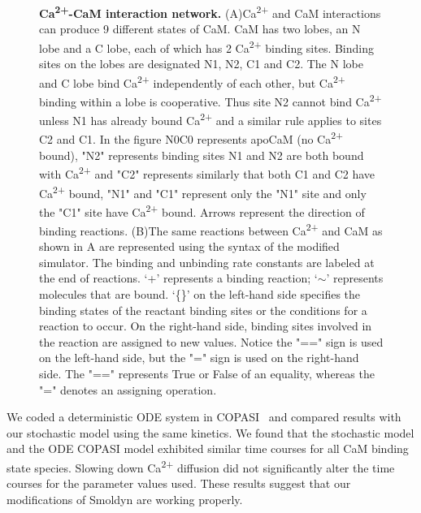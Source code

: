 \documentclass[10pt,letterpaper]{article}
\begin{document}
\begin{figure}[!h]
	\caption{{\bf Ca\textsuperscript{2+}-CaM interaction network.}
	(A)Ca\textsuperscript{2+} and CaM interactions can produce 9 different states of CaM. CaM has two lobes, an N lobe and a C lobe, each of which has 2 Ca\textsuperscript{2+} binding sites. Binding sites on the lobes are designated N1, N2, C1 and C2. The N lobe and C lobe bind Ca\textsuperscript{2+} independently of each other, but Ca\textsuperscript{2+} binding within a lobe is cooperative. Thus site N2 cannot bind Ca\textsuperscript{2+} unless N1 has already bound Ca\textsuperscript{2+} and a similar rule applies to sites C2 and C1. In the figure N0C0 represents apoCaM (no Ca\textsuperscript{2+} bound), "N2" represents binding sites N1 and N2 are both bound with Ca\textsuperscript{2+} and "C2" represents similarly that both C1 and C2 have Ca\textsuperscript{2+} bound, "N1" and "C1" represent only the "N1" site and only the "C1" site have Ca\textsuperscript{2+} bound. Arrows represent the direction of binding reactions.
	(B)The same reactions between Ca\textsuperscript{2+} and CaM as shown in A are represented using the syntax of the modified simulator. The binding and unbinding rate constants are labeled at the end of reactions. ‘+’ represents a binding reaction; ‘$\sim$’ represents molecules that are bound. ‘\{\}’ on the left-hand side specifies the binding states of the reactant binding sites or the conditions for a reaction to occur. On the right-hand side, binding sites involved in the reaction are assigned to new values. Notice the "==" sign is used on the left-hand side, but the "=" sign is used on the right-hand side. The "==" represents True or False of an equality, whereas the "=" denotes an assigning operation. 
	}
\label{fig1}
\end{figure}

We coded a deterministic ODE system in COPASI~\cite{Hoops:2006gy} and compared results with our stochastic model using the same kinetics. We found that the stochastic model and the ODE COPASI model exhibited similar time courses for all CaM binding state species. Slowing down Ca\textsuperscript{2+} diffusion did not significantly alter the time courses for the parameter values used. These results suggest that our modifications of Smoldyn are working properly. 
%	 
\end{document}
